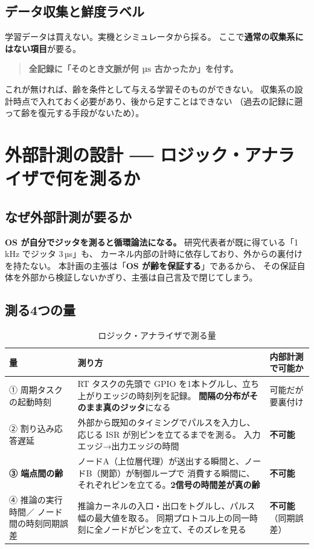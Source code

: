 \documentclass[11pt,a4paper]{article}
\newcommand{\prob}[1]{\textbf{\textcolor{red!55!black}{#1}}}
\newcommand{\keyp}[1]{\textbf{\textcolor{blue!45!black}{#1}}}
\begin{document}
\subsection{データ収集と鮮度ラベル}

学習データは買えない。実機とシミュレータから採る。
ここで\keyp{通常の収集系にはない項目}が要る。

\begin{quote}
\keyp{全記録に「そのとき文脈が何 µs 古かったか」を付す。}
\end{quote}

\noindent
これが無ければ、齢を条件として与える学習そのものができない。
収集系の設計時点で入れておく必要があり、後から足すことはできない
（過去の記録に遡って齢を復元する手段がないため）。

\section{外部計測の設計 ── ロジック・アナライザで何を測るか}
\label{sec:measure}

\subsection{なぜ外部計測が要るか}

\prob{OS が自分でジッタを測ると循環論法になる。}
研究代表者が既に得ている「1\,kHz でジッタ 3\,µs」も、
カーネル内部の計時に依存しており、外からの裏付けを持たない。
本計画の主張は「\keyp{OS が齢を保証する}」であるから、
その保証自体を外部から検証しないかぎり、主張は自己言及で閉じてしまう。

\subsection{測る4つの量}

\begin{table}[htbp]
\centering
\small
\caption{ロジック・アナライザで測る量}
\begin{tabularx}{\textwidth}{@{}l X l@{}}
\toprule
\textbf{量} & \textbf{測り方} & \textbf{内部計測で可能か} \\
\midrule
① 周期タスクの起動時刻 &
  RT タスクの先頭で GPIO を1本トグルし、立ち上がりエッジの時刻列を記録。
  \keyp{間隔の分布がそのまま真のジッタ}になる & 可能だが要裏付け \\
\midrule
② 割り込み応答遅延 &
  外部から既知のタイミングでパルスを入力し、応じる ISR が別ピンを立てるまでを測る。
  入力エッジ→出力エッジの時間 & \prob{不可能} \\
\midrule
\keyp{③ 端点間の齢} &
  ノードA（上位層代理）が送出する瞬間と、ノードB（関節）が制御ループで
  消費する瞬間に、それぞれピンを立てる。\keyp{2信号の時間差が真の齢} &
  \prob{不可能} \\
\midrule
④ 推論の実行時間／
  ノード間の時刻同期誤差 &
  推論カーネルの入口・出口をトグルし、パルス幅の最大値を取る。
  同期プロトコル上の同一時刻に全ノードがピンを立て、そのズレを見る &
  \prob{不可能}（同期誤差） \\
\bottomrule
\end{tabularx}
\end{table}
\end{document}
